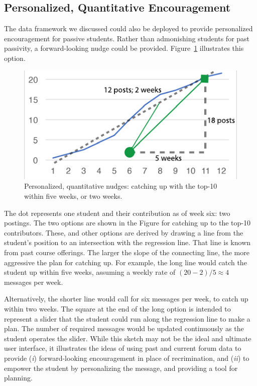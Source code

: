 \subsection{Personalized, Quantitative Encouragement}
The data framework we discussed could also be deployed to provide
personalized encouragement for passive students. Rather than
admonishing students for past passivity, a forward-looking nudge could
be provided. Figure~\ref{fig:nudgeAngles} illustrates this option.
\begin{figure}[htp]
       \centering
       \includegraphics{Figs/angleTrajectories.pdf}
       \caption{\textnormal{Personalized, quantitative nudges:
           catching up with the top-10 within five weeks, or two
           weeks.}}
       \label{fig:nudgeAngles}
\end{figure}
The dot represents one student and their contribution as of week six:
two postings. The two options are shown in the Figure for catching up
to the top-10 contributors. These, and other options are derived by
drawing a line from the student's position to an intersection with the
regression line. That line is known from past course offerings. The
larger the slope of the connecting line, the more aggressive the plan
for catching up. For example, the long line would catch the student up
within five weeks, assuming a weekly rate of $(20-2)/5 \approx 4$ messages
per week.

Alternatively, the shorter line would call for six messages per week,
to catch up within two weeks. The square at the end of the long option
is intended to represent a slider that the student could run along the
regression line to make a plan. The number of required messages would
be updated continuously as the student operates the slider. While this
sketch may not be the ideal and ultimate user interface, it
illustrates the ideas of using past and current forum data to provide
({\em i}) forward-looking encouragement in place of recrimination, and
({\em ii}) to empower the student by personalizing the message, and
providing a tool for planning.

